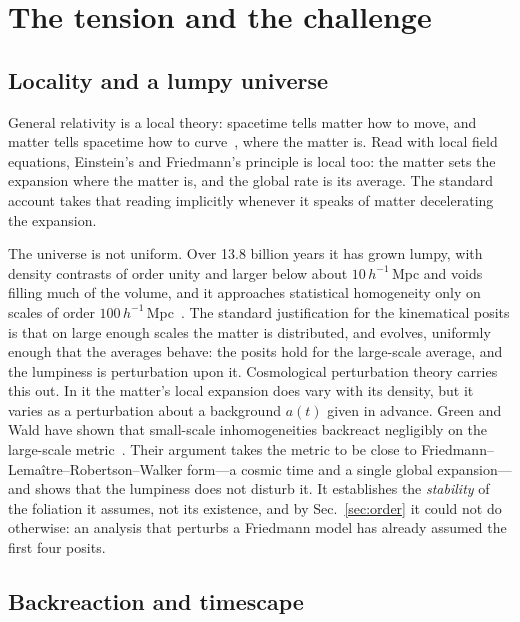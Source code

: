 \documentclass[aps,prd,reprint,amsmath,amssymb,superscriptaddress]{revtex4-2}
\begin{document}
\section{The tension and the challenge}\label{sec:challenge}

\subsection{Locality and a lumpy universe}\label{sec:tension}

General relativity is a local theory: spacetime tells matter how to move, and matter tells spacetime how to curve~\cite{Wheeler1998}, where the matter is. Read with local field equations, Einstein's and Friedmann's principle is local too: the matter sets the expansion where the matter is, and the global rate is its average. The standard account takes that reading implicitly whenever it speaks of matter decelerating the expansion.

The universe is not uniform. Over 13.8 billion years it has grown lumpy, with density contrasts of order unity and larger below about $10\,h^{-1}$\,Mpc and voids filling much of the volume, and it approaches statistical homogeneity only on scales of order $100\,h^{-1}$\,Mpc~\cite{Scrimgeour2012}. The standard justification for the kinematical posits is that on large enough scales the matter is distributed, and evolves, uniformly enough that the averages behave: the posits hold for the large-scale average, and the lumpiness is perturbation upon it. Cosmological perturbation theory carries this out. In it the matter's local expansion does vary with its density, but it varies as a perturbation about a background $a(t)$ given in advance. Green and Wald have shown that small-scale inhomogeneities backreact negligibly on the large-scale metric~\cite{GreenWald2011, GreenWald2014}. Their argument takes the metric to be close to Friedmann--Lema\^itre--Robertson--Walker form---a cosmic time and a single global expansion---and shows that the lumpiness does not disturb it. It establishes the \emph{stability} of the foliation it assumes, not its existence, and by Sec.~\ref{sec:order} it could not do otherwise: an analysis that perturbs a Friedmann model has already assumed the first four posits.

\subsection{Backreaction and timescape}\label{sec:backreaction}
\end{document}
